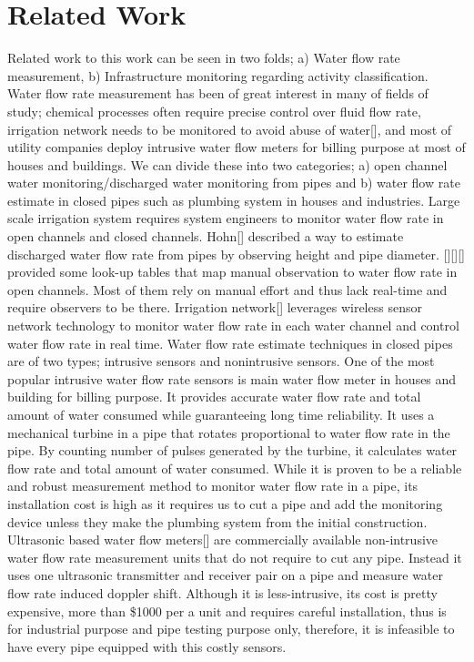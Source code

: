 \section{Related Work}
Related work to this work can be seen in two folds; a) Water flow rate measurement, b) Infrastructure monitoring regarding activity classification.
Water flow rate measurement has been of great interest in many of fields of study; chemical processes often require precise control over fluid flow rate, irrigation network needs to be monitored to avoid abuse of water[], and most of utility companies deploy intrusive water flow meters for billing purpose at most of houses and buildings. We can divide these into two categories; a) open channel water monitoring/discharged water monitoring from pipes and b) water flow rate estimate in closed pipes such as plumbing system in houses and industries.  
Large scale irrigation system requires system engineers to monitor water flow rate in open channels and closed channels. Hohn[] described a way to estimate discharged water flow rate from pipes by observing height and pipe diameter. [][][] provided some look-up tables that map manual observation to water flow rate in open channels. Most of them rely on manual effort and thus lack real-time and require observers to be there. Irrigation network[] leverages wireless sensor network technology to monitor water flow rate in each water channel and control water flow rate in real time. 
Water flow rate estimate techniques in closed pipes are of two types; intrusive sensors and nonintrusive sensors. One of the most popular intrusive water flow rate sensors is main water flow meter in houses and building for billing purpose. It provides accurate water flow rate and total amount of water consumed while guaranteeing long time reliability. It uses a mechanical turbine in a pipe that rotates proportional to water flow rate in the pipe. By counting number of pulses generated by the turbine, it calculates water flow rate and total amount of water consumed. While it is proven to be a reliable and robust measurement method to monitor water flow rate in a pipe, its installation cost is high as it requires us to cut a pipe and add the monitoring device unless they make the plumbing system from the initial construction. 
Ultrasonic based water flow meters[] are commercially available non-intrusive water flow rate measurement units that do not require to cut any pipe. Instead it uses one ultrasonic transmitter and receiver pair on a pipe and measure water flow rate induced doppler shift. Although it is less-intrusive, its cost is pretty expensive, more than \$1000 per a unit and requires careful installation, thus is for industrial purpose and pipe testing purpose only, therefore, it is infeasible to have every pipe equipped with this costly sensors.
